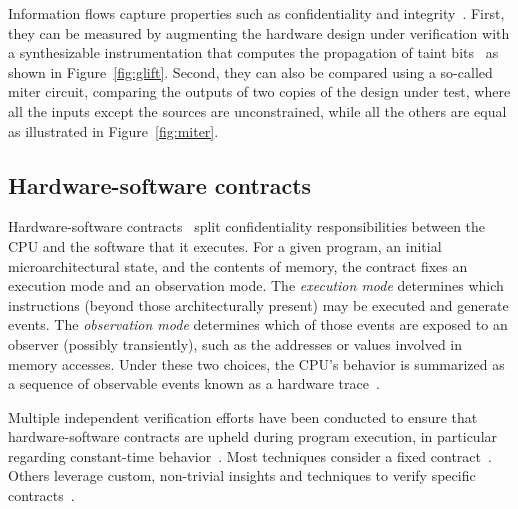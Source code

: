 Information flows capture properties such as confidentiality and integrity~\cite{hu2021hardware}.
First, they can be measured by augmenting the hardware design under verification with a synthesizable instrumentation that computes the propagation of taint bits~\cite{tiwari2009complete,ardeshiricham2017register,solt2022cellift,solt2024hybridift,ceesay2024mucfi} as shown in Figure~\ref{fig:glift}.
Second, they can also be compared using a so-called miter circuit, comparing the outputs of two copies of the design under test, where all the inputs except the sources are unconstrained, while all the others are equal as illustrated in Figure~\ref{fig:miter}.



\subsection{Hardware-software contracts}
\label{subsec:hw-sw-contracts}


Hardware-software contracts~\cite{guarnieri2021hardware} split confidentiality responsibilities between the CPU and the software that it executes.
For a given program, an initial microarchitectural state, and the contents of memory, the contract fixes an execution mode and an observation mode.
The \emph{execution mode} determines which instructions (beyond those architecturally present) may be executed and generate events.
The \emph{observation mode} determines which of those events are exposed to an observer (possibly transiently), such as the addresses or values involved in memory accesses. Under these two choices, the CPU's behavior is summarized as a sequence of observable events known as a hardware trace~\cite{guarnieri2021hardware,oleksenko2022revizor}.



Multiple independent verification efforts have been conducted to ensure that hardware-software contracts are upheld during program execution, in particular regarding constant-time behavior~\cite{dinesh2024conjunct,ceesay2024mucfi,guarnieri2021hardware,tan2025contractshadowlogic,dinesh2025h,hsiao2024rtl2mmupath,wang2023specification}.
Most techniques consider a fixed contract~\cite{dinesh2024conjunct,ceesay2024mucfi,tan2025contractshadowlogic,dinesh2025h}.
Others leverage custom, non-trivial insights and techniques to verify specific contracts~\cite{hsiao2024rtl2mmupath,wang2023specification}.


